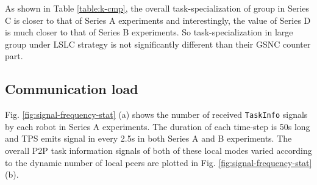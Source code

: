 \documentclass[journal]{IEEEtran}
\begin{document}
As shown in Table \ref{table:k-cmp}, the overall task-specialization of group in Series C  is  closer to that of Series A experiments  and interestingly, the value of  Series D is  much closer to that of Series B experiments. So task-specialization in large group under LSLC strategy is not significantly different than their GSNC counter part.
\vspace*{-0.3cm}
\subsection{Communication load}
\vspace*{-0.1cm}
\begin{figure*}[h!]
\centering
{}
{}
\caption{Frequency of \texttt{TaskInfo} signalling of (a) by TPS and (b) by local peers.}
\label{fig:signal-frequency-stat}
\vspace*{-0.6cm}
\end{figure*}
Fig. \ref{fig:signal-frequency-stat} (a) shows the number of received \texttt{TaskInfo} signals by each robot in Series A  experiments. The duration of each time-step is 50s long and TPS emits signal in every 2.5s in both Series A and B experiments. The overall P2P task information signals of both of these local modes varied according to the dynamic number of local peers are plotted in Fig. \ref{fig:signal-frequency-stat} (b).
\vspace*{-0.3cm}
\end{document}
